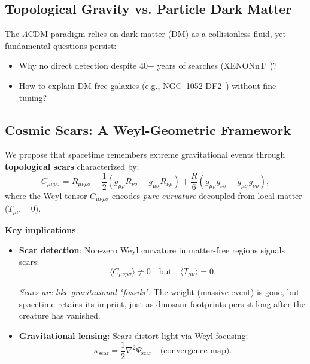 \documentclass{article}
\begin{document}
\subsection{Topological Gravity vs. Particle Dark Matter}
The $\Lambda$CDM paradigm relies on dark matter (DM) as a collisionless fluid, yet fundamental questions persist:
\begin{itemize}
    \item Why no direct detection despite 40+ years of searches (XENONnT~\cite{XENONnT2023})?
    \item How to explain DM-free galaxies (e.g., NGC~1052-DF2~\cite{vanDokkum2018}) without fine-tuning?
\end{itemize}

\subsection{Cosmic Scars: A Weyl-Geometric Framework}
We propose that spacetime remembers extreme gravitational events through \textbf{topological scars} characterized by:
\begin{equation}
    C_{\mu\nu\rho\sigma} = R_{\mu\nu\rho\sigma} - \frac{1}{2}(g_{\mu\rho}R_{\nu\sigma} - g_{\mu\sigma}R_{\nu\rho}) + \frac{R}{6}(g_{\mu\rho}g_{\nu\sigma} - g_{\mu\sigma}g_{\nu\rho}),
    \label{eq:weyl}
\end{equation}
where the Weyl tensor $C_{\mu\nu\rho\sigma}$ encodes \textit{pure curvature} decoupled from local matter ($T_{\mu\nu} = 0$). \par
\bigskip
\textbf{Key implications}:
\begin{itemize}
    \item \textbf{Scar detection}: Non-zero Weyl curvature in matter-free regions signals scars:
    \begin{equation}
        \langle C_{\mu\nu\rho\sigma} \rangle \neq 0 \quad \text{but} \quad \langle T_{\mu\nu} \rangle = 0.
        \label{eq:scar_condition}
    \end{equation}

\begin{tcolorbox}[colback=boxnormal,colframe=blue!50!black,title=Intuitive Picture]
\textit{Scars are like gravitational "fossils":}  
The weight (massive event) is gone, but spacetime retains its imprint, just as dinosaur footprints persist long after the creature has vanished.
\end{tcolorbox}

    \item \textbf{Gravitational lensing}: Scars distort light via Weyl focusing:
    \begin{equation}
        \kappa_{\text{scar}} = \frac{1}{2} \nabla^2 \Psi_{\text{scar}} \quad \text{(convergence map)}.
        \label{eq:lensing}
    \end{equation}
\end{itemize}
\end{document}
